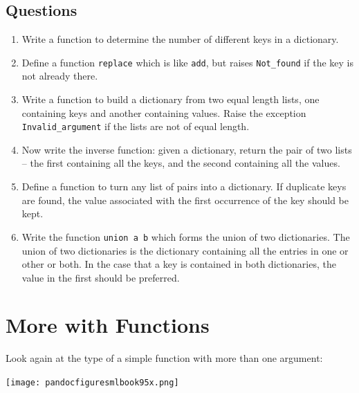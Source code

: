 \documentclass[]{book}
\begin{document}
\clearpage
\section*{Questions}

\begin{enumerate}
\item Write a function to determine the number of different keys in a dictionary.

\item Define a function \texttt{replace} which is like \texttt{add}, but raises \texttt{Not\_found} if the key is not already there.

\item Write a function to build a dictionary from two equal length lists, one containing keys and another containing values. Raise the exception \texttt{Invalid\_argument} if the lists are not of equal length.

\item Now write the inverse function: given a dictionary, return the pair of two lists -- the first containing all the keys, and the second containing all the values.

\item Define a function to turn any list of pairs into a dictionary. If duplicate keys are found, the value associated with the first occurrence of the key should be kept.

\item Write the function \texttt{union a b} which forms the union of two dictionaries. The union of two dictionaries is the dictionary containing all the entries in one or other or both. In the case that a key is contained in both dictionaries, the value in the first should be preferred. 

\end{enumerate}


\cleardoublepage
\thispagestyle{empty}


\pagestyle{empty}



\chapter{More with Functions}
\pagestyle{fancy}

Look again at the type of a simple function with more than one argument:

\medskip
\begin{center}
\noindent\texttt{[image: pandocfiguresmlbook95x.png]}
\end{center}
\medskip
\end{document}

